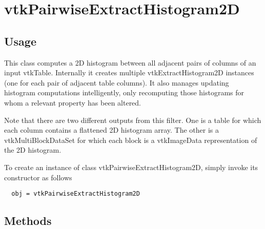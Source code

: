 \section{vtkPairwiseExtractHistogram2D}

\subsection{Usage}

  This class computes a 2D histogram between all adjacent pairs of columns 
  of an input vtkTable. Internally it creates multiple vtkExtractHistogram2D
  instances (one for each pair of adjacent table columns).  It also
  manages updating histogram computations intelligently, only recomputing
  those histograms for whom a relevant property has been altered.

  Note that there are two different outputs from this filter.  One is a 
  table for which each column contains a flattened 2D histogram array.
  The other is a vtkMultiBlockDataSet for which each block is a 
  vtkImageData representation of the 2D histogram.


To create an instance of class vtkPairwiseExtractHistogram2D, simply
invoke its constructor as follows
\begin{verbatim}
  obj = vtkPairwiseExtractHistogram2D
\end{verbatim}
\subsection{Methods}

